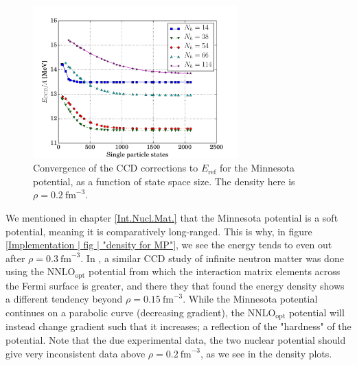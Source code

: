 \documentclass[10pt,twoside]{report}
\begin{document}
	\begin{figure}[h]
		\centering
		\captionsetup{width=.8\textwidth}
		\includegraphics[width=0.7\textwidth]{Figures/MP_CCD_RUNS.pdf}
		\caption{Convergence of the CCD corrections to $E_{\text{ref}}$ for the Minnesota potential, as a function of state space size. The density here is $\rho=0.2\:\text{fm}^{-3}$.}
		\label{Implementation | fig | "MP state dependency"}
	\end{figure}
	
	We mentioned in chapter \ref{Int.Nucl.Mat.} that the Minnesota potential is a soft potential, meaning it is comparatively long-ranged. This is why, in figure \ref{Implementation | fig | "density for MP"}, we see the energy tends to even out after $\rho = 0.3\:\text{fm}^{-3}$. In \cite{GHagen14}, a similar CCD study of infinite neutron matter was done using the $\text{NNLO}_{\text{opt}}$ potential from which the interaction matrix elements across the Fermi surface is greater, and there they that found the energy density shows a different tendency beyond $\rho=0.15\:\text{fm}^{-3}$. While the Minnesota potential continues on a parabolic curve (decreasing gradient), the $\text{NNLO}_{\text{opt}}$ potential will instead change gradient such that it increases; a reflection of the "hardness" of the potential. Note that the due experimental data, the two nuclear potential should give very inconsistent data above $\rho=0.2\:\text{fm}^{-3}$, as we see in the density plots.
	
\end{document}
